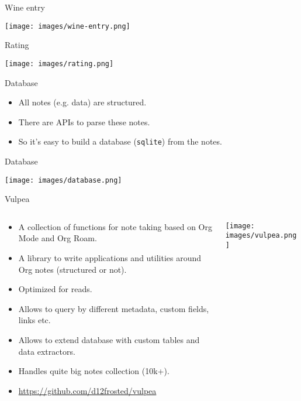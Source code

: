 \documentclass[presentation,aspectratio=169,smaller]{beamer}
\begin{document}
\begin{frame}[label={sec:org1ff6a95}]{Wine entry}
\begin{center}
\texttt{[image: images/wine-entry.png]}
\end{center}
\end{frame}

\begin{frame}[label={sec:org916a648}]{Rating}
\begin{center}
\texttt{[image: images/rating.png]}
\end{center}
\end{frame}

\begin{frame}[label={sec:org21ffc73},fragile]{Database}
 \begin{itemize}
\item All notes (e.g. data) are structured.
\item There are APIs to parse these notes.
\item So it's easy to build a database (\texttt{sqlite}) from the notes.
\end{itemize}
\end{frame}

\begin{frame}[label={sec:org7d5fcac}]{Database}
\begin{center}
\texttt{[image: images/database.png]}
\end{center}
\end{frame}

\begin{frame}[label={sec:orge476030}]{Vulpea}
\begin{columns}
\begin{column}{0.75\columnwidth}
\begin{itemize}
\item A collection of functions for note taking based on Org Mode and Org Roam.
\item A library to write applications and utilities around Org notes (structured or not).
\item Optimized for reads.
\item Allows to query by different metadata, custom fields, links etc.
\item Allows to extend database with custom tables and data extractors.
\item Handles quite big notes collection (10k+).
\item \url{https://github.com/d12frosted/vulpea}
\end{itemize}
\end{column}

\begin{column}{0.25\columnwidth}
\begin{center}
\texttt{[image: images/vulpea.png]}
\end{center}
\end{column}
\end{columns}
\end{frame}
\end{document}
